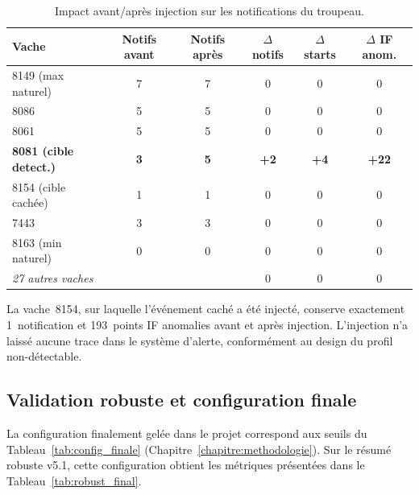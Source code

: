 \begin{table}[H]
    \centering
    \caption{Impact avant/après injection sur les notifications du troupeau.}
    \label{tab:before_after}
    \small
    \begin{tabular}{lccccc}
        \toprule
        \textbf{Vache} & \textbf{Notifs avant} & \textbf{Notifs après}
            & $\Delta$ \textbf{notifs} & $\Delta$ \textbf{starts}
            & $\Delta$ \textbf{IF anom.} \\
        \midrule
        8149 (max naturel)  & 7 & 7 & 0 & 0 & 0 \\
        8086                & 5 & 5 & 0 & 0 & 0 \\
        8061                & 5 & 5 & 0 & 0 & 0 \\
        \textbf{8081 (cible detect.)} & \textbf{3} & \textbf{5} & \textbf{+2}
            & \textbf{+4} & \textbf{+22} \\
        8154 (cible cachée) & 1 & 1 & 0 & 0 & 0 \\
        7443                & 3 & 3 & 0 & 0 & 0 \\
        8163 (min naturel)  & 0 & 0 & 0 & 0 & 0 \\
        \midrule
        \multicolumn{2}{l}{\textit{27 autres vaches}} & & 0 & 0 & 0 \\
        \bottomrule
    \end{tabular}
\end{table}

La vache~8154, sur laquelle l'événement caché a été injecté, conserve exactement
1~notification et 193~points IF anomalies avant et après injection. L'injection
n'a laissé aucune trace dans le système d'alerte, conformément au design du profil
non-détectable.

\subsection{Validation robuste et configuration finale}

La configuration finalement gelée dans le projet correspond aux seuils du
Tableau~\ref{tab:config_finale} (Chapitre~\ref{chapitre:methodologie}). Sur le résumé
robuste v5.1, cette configuration obtient les métriques présentées dans le
Tableau~\ref{tab:robust_final}.

